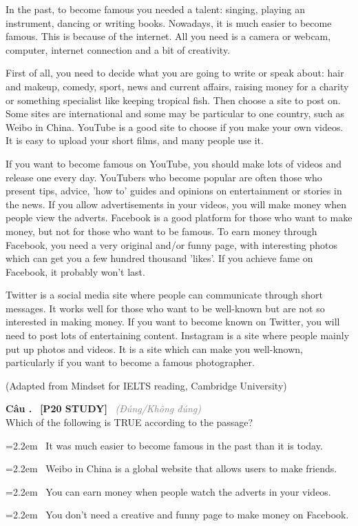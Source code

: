 \documentclass[12pt,a4paper,twoside]{article}
\newcounter{qcounter}
\newcommand{\question}[2][]{%
    \stepcounter{qcounter}%
    \par\vspace{6pt}%
    \noindent\textcolor{primaryBlue}{\textbf{Câu \theqcounter.}}~%
    \textcolor{secondaryBlue}{\small\textbf{[P20 STUDY]}}~%
    \if\relax\detokenize{#1}\relax\else\textcolor{gray}{\small\textit{(#1)}}~\fi\\[1pt]
    \noindent #2%
}
\newcommand{\choiceitem}[2]{%
    \tikz[baseline=-0.5ex]{%
        \node[draw=primaryBlue, circle, minimum size=1.5em, inner sep=0pt, thick] {\textbf{#1}};%
    }~#2%
}
\newenvironment{readingpassage}[1][]{%
    \begin{tcolorbox}[enhanced, colback=grayLight, colframe=secondaryBlue,
        coltitle=textDark, fonttitle=\bfseries, title={#1},
        rounded corners, arc=3mm, boxrule=1pt,
        left=15pt, right=15pt, top=10pt, bottom=10pt,
        breakable, before skip=10pt, after skip=10pt, drop fuzzy shadow]
    \setstretch{1.3}
}{\end{tcolorbox}}
\begin{document}
\begin{readingpassage}[]
In the past, to become famous you needed a talent: singing, playing an instrument, dancing or writing books. Nowadays, it is much easier to become famous. This is because of the internet. All you need is a camera or webcam, computer, internet connection and a bit of creativity.

First of all, you need to decide what you are going to write or speak about: hair and makeup, comedy, sport, news and current affairs, raising money for a charity or something specialist like keeping tropical fish. Then choose a site to post on. Some sites are international and some may be particular to one country, such as Weibo in China. YouTube is a good site to choose if you make your own videos. It is easy to upload your short films, and many people use it.

If you want to become famous on YouTube, you should make lots of videos and release one every day. YouTubers who become popular are often those who present tips, advice, 'how to' guides and opinions on entertainment or stories in the news. If you allow advertisements in your videos, you will make money when people view the adverts. Facebook is a good platform for those who want to make money, but not for those who want to be famous. To earn money through Facebook, you need a very original and/or funny page, with interesting photos which can get you a few hundred thousand 'likes'. If you achieve fame on Facebook, it probably won't last.

Twitter is a social media site where people can communicate through short messages. It works well for those who want to be well-known but are not so interested in making money. If you want to become known on Twitter, you will need to post lots of entertaining content. Instagram is a site where people mainly put up photos and videos. It is a site which can make you well-known, particularly if you want to become a famous photographer.

(Adapted from Mindset for IELTS reading, Cambridge University)
\end{readingpassage}

\question[Đúng/Không đúng]{Which of the following is TRUE according to the passage?}

\par\vspace{4pt}
\noindent\hangindent=2.2em\choiceitem{A}{It was much easier to become famous in the past than it is today.}\par\vspace{4pt}
\noindent\hangindent=2.2em\choiceitem{B}{Weibo in China is a global website that allows users to make friends.}\par\vspace{4pt}
\noindent\hangindent=2.2em\choiceitem{C}{You can earn money when people watch the adverts in your videos.}\par\vspace{4pt}
\noindent\hangindent=2.2em\choiceitem{D}{You don't need a creative and funny page to make money on Facebook.}\par\vspace{4pt}
\end{document}
